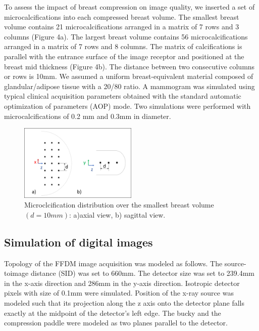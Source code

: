 To assess the impact of breast compression on image quality, we inserted a set of microcalcifications into each compressed breast volume. The smallest breast volume contains 21 microcalcifications arranged in a matrix of 7 rows and 3 columns (Figure 4a). The largest breast volume contains 56 microcalcifications arranged in a matrix of 7 rows and 8 columns. The matrix of calcifications is parallel with the entrance surface of the image receptor and positioned at the breast mid thickness (Figure 4b). The distance between two consecutive columns or rows is 10mm. We assumed a uniform breast-equivalent material composed of glandular/adipose tissue with a 20/80 ratio. A mammogram was simulated using typical clinical acquisition parameters obtained with the standard automatic optimization of parameters (AOP) mode. Two simulations were performed with microcalcifications of 0.2 mm and 0.3mm in diameter.

\begin{figure}[!h]
\centering
\includegraphics[width=0.5\textwidth,keepaspectratio]{figures/microcalcifications.png} 
\caption{Microclcification distribution over the smallest breast volume $(d=10mm)$: a)axial view, b) sagittal view.}\label{fig:compressionpaddles}
\end{figure}

\subsection{Simulation of digital images}

Topology of the FFDM image acquisition was modeled as follows. The source-toimage
distance (SID) was set to 660mm. The detector size was set to 239.4mm in the
x-axis direction and 286mm in the y-axis direction. Isotropic detector pixels with size of
0.1mm were simulated. Position of the x-ray source was modeled such that its projection
along the z axis onto the detector plane falls exactly at the midpoint of the detector’s left
edge. The bucky and the compression paddle were modeled as two planes parallel to the
detector.


